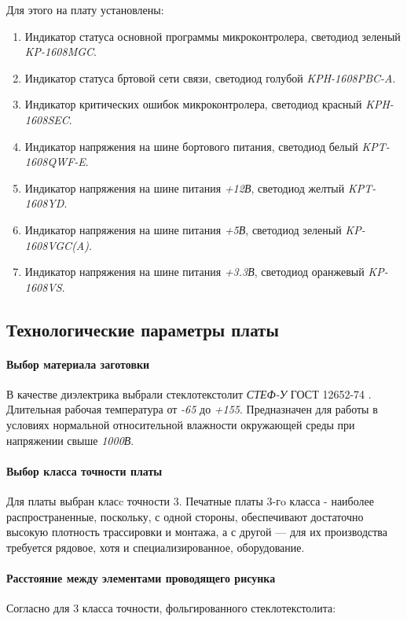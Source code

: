 \documentclass{article}
\begin{document}
Для этого на плату установлены:
\begin{enumerate}
    \item Индикатор статуса основной программы микроконтролера, светодиод зеленый \textit{KP-1608MGC}.
    \item Индикатор статуса бртовой сети связи, светодиод голубой \textit{KPH-1608PBC-A}.
    \item Индикатор критических ошибок микроконтролера, светодиод красный \textit{KPH-1608SEC}.
    \item Индикатор напряжения на шине бортового питания, светодиод белый \textit{KPT-1608QWF-E}.
    \item Индикатор напряжения на шине питания \textit{+12В}, светодиод желтый \textit{KPT-1608YD}.
    \item Индикатор напряжения на шине питания \textit{+5В}, светодиод зеленый \textit{KP-1608VGC(A)}.
    \item Индикатор напряжения на шине питания \textit{+3.3В}, светодиод оранжевый \textit{KP-1608VS}.
\end{enumerate}

\subsection{Технологические параметры платы}
\paragraph{Выбор материала заготовки}
В качестве диэлектрика выбрали стеклотекстолит \textit{СТЕФ-У} ГОСТ 12652-74 \cite{GOST_12652_74}.
Длительная рабочая температура от \textit{-65\textcelsius} до \textit{+155\textcelsius}.
Предназначен для работы в условиях нормальной относительной влажности
окружающей среды при напряжении свыше \textit{1000В}.

\paragraph{Выбор класса точности платы}
Для платы выбран класc точности 3.
Печатные платы 3-гo класса - наиболее распространенные, поскольку, с одной
стороны, обеспечивают достаточно высокую плотность трассировки и монтажа, а с
другой — для их производства требуется рядовое, хотя и специализированное,
оборудование.

\paragraph{Расстояние между элементами проводящего рисунка}
Согласно \cite[Табл. 7]{GOST_23751_86} для 3 класса точности,
фольгированного стеклотекстолита:
\end{document}
